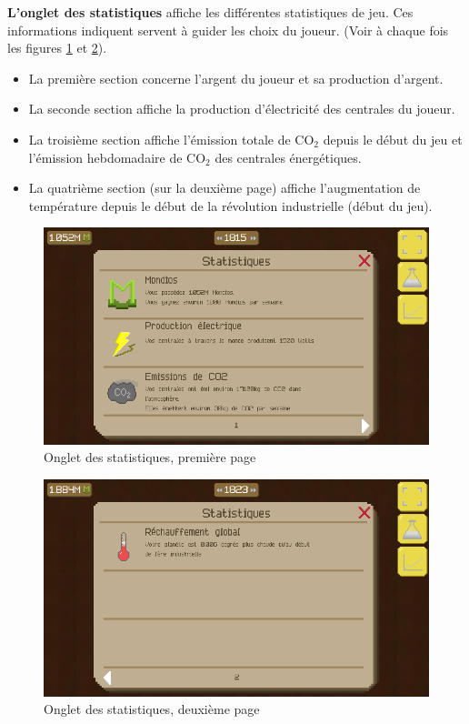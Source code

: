 \documentclass{article}
\begin{document}
        
        \textbf{L'onglet des statistiques} affiche les différentes statistiques de jeu. Ces informations indiquent servent à guider les choix du joueur. (Voir à chaque fois les figures \ref{fig:stats1} et \ref{fig:stats2}).
        \begin{itemize}
        		\item La première section concerne l'argent du joueur et sa production d'argent.
        		\item La seconde section affiche la production d'électricité des centrales du joueur.
        		\item La troisième section affiche l'émission totale de CO$_{2}$ depuis le début du jeu et l'émission hebdomadaire de CO$_{2}$ des centrales énergétiques.
        		\item La quatrième section (sur la deuxième page) affiche l'augmentation de température depuis le début de la révolution industrielle (début du jeu).
        \end{itemize}
        \begin{figure}[H]
                \includegraphics[width=\linewidth]{../images/stats1}
                \caption{Onglet des statistiques, première page}
                \label{fig:stats1}
        \end{figure}
        \begin{figure}[H]
                \includegraphics[width=\linewidth]{../images/stats2}
                \caption{Onglet des statistiques, deuxième page}
                \label{fig:stats2}
        \end{figure}
		
\end{document}
